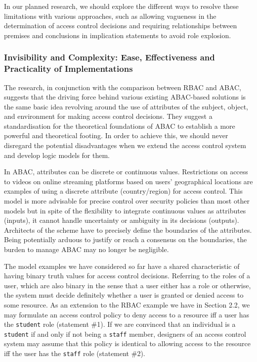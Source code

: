 \documentclass{article}
\begin{document}
In our planned research, we should explore the different ways to resolve
these limitations with various approaches, such as allowing vagueness in the
determination of access control decisions and requiring relationships between
premises and conclusions in implication statements to avoid role explosion.

\subsubsection{Invisibility and Complexity: Ease, Effectiveness and
Practicality of Implementations}

The research, in conjunction with the comparison between RBAC and ABAC,
suggests that the driving force behind various existing ABAC-based solutions
is the same basic idea revolving around the use of attributes of the subject,
object, and environment for making access control decisions.\cite{rbac-vs-abac}
They suggest a standardisation for the theoretical foundations of ABAC to
establish a more powerful and theoretical footing. In order to achieve this,
we should never disregard the potential disadvantages when we extend the
access control system and develop logic models for them.

In ABAC, attributes can be discrete or continuous values.\cite{abac-logic}
Restrictions on access to videos on online streaming platforms based on
users' geographical locations are examples of using a discrete attribute
(country/region) for access control. This model is more advisable for precise
control over security policies than most other models but in spite of the
flexibility to integrate continuous values as attributes (inputs), it cannot
handle uncertainty or ambiguity in its decisions (outputs). Architects of
the scheme have to precisely define the boundaries of the attributes. Being
potentially arduous to justify or reach a consensus on the boundaries,
the burden to manage ABAC may no longer be negligible.

The model examples we have considered so far have a shared characteristic
of having binary truth values for access control decisions. Referring to
the roles of a user, which are also binary in the sense that a user either
has a role or otherwise, the system must decide definitely whether a user
is granted or denied access to some resource. As an extension to the RBAC
example we have in Section 2.2, we may formulate an access control policy to
deny access to a resource iff a user has the \texttt{student} role (statement
\#1). If we are convinced that an individual is a \texttt{student} if and
only if not being a \texttt{staff} member, designers of an access control
system may assume that this policy is identical to allowing access to the
resource iff the user has the \texttt{staff} role (statement \#2).
\end{document}
